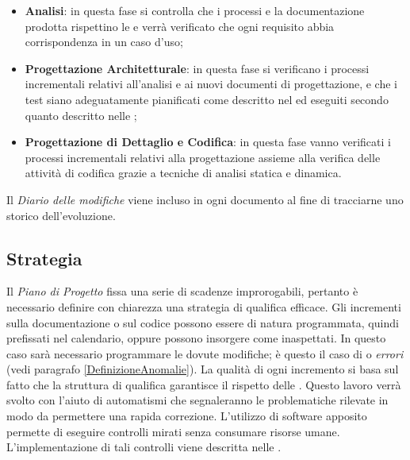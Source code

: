 	\begin{itemize}
		\item \textbf{Analisi}: in questa fase si controlla che i processi e la documentazione prodotta rispettino le \NormeDiProgetto{} e verrà verificato che ogni requisito abbia corrispondenza in un caso d’uso;
		\item \textbf{Progettazione Architetturale}: in questa fase si verificano i processi incrementali relativi all'analisi e ai nuovi documenti di progettazione, e che i test siano adeguatamente pianificati come descritto nel \PianoDiProgetto{} ed eseguiti secondo quanto descritto nelle \NormeDiProgetto;
		\item \textbf{Progettazione di Dettaglio e Codifica}: in questa fase vanno verificati i processi incrementali relativi alla progettazione assieme alla verifica delle attività di codifica grazie a tecniche di analisi statica e dinamica.
	\end{itemize}
	
	Il \emph{Diario delle modifiche} viene incluso in ogni documento al fine di tracciarne uno storico dell'evoluzione.
	
	\subsection{Strategia}

		Il \emph{Piano di Progetto} fissa una serie di scadenze improrogabili, pertanto è necessario definire con chiarezza una strategia di qualifica efficace. Gli incrementi sulla documentazione o sul codice possono essere di natura programmata, quindi prefissati nel calendario, oppure possono insorgere come inaspettati. In questo caso sarà necessario programmare le dovute modifiche; è questo il caso di  o \emph{errori} (vedi paragrafo \ref{DefinizioneAnomalie}). La qualità di ogni incremento si basa sul fatto che la struttura di qualifica garantisce il rispetto delle  \NormeDiProgetto{}. Questo lavoro verrà svolto con l'aiuto di automatismi che segnaleranno le problematiche rilevate in modo da permettere una rapida correzione. L'utilizzo di software apposito permette di eseguire controlli mirati senza consumare risorse umane. L'implementazione di tali controlli viene descritta nelle \NormeDiProgetto{}.
			

